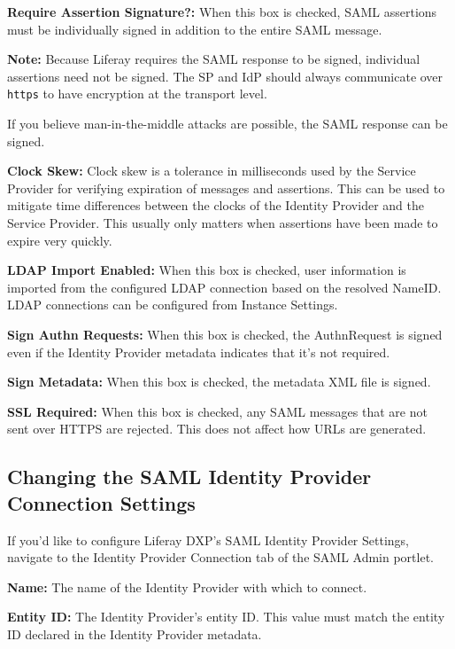 \textbf{Require Assertion Signature?:} When this box is checked, SAML
assertions must be individually signed in addition to the entire SAML
message.

\noindent\hrulefill

\textbf{Note:} Because Liferay requires the SAML response to be signed,
individual assertions need not be signed. The SP and IdP should always
communicate over \texttt{https} to have encryption at the transport
level.

If you believe man-in-the-middle attacks are possible, the SAML response
can be signed.

\noindent\hrulefill

\textbf{Clock Skew:} Clock skew is a tolerance in milliseconds used by
the Service Provider for verifying expiration of messages and
assertions. This can be used to mitigate time differences between the
clocks of the Identity Provider and the Service Provider. This usually
only matters when assertions have been made to expire very quickly.

\textbf{LDAP Import Enabled:} When this box is checked, user information
is imported from the configured LDAP connection based on the resolved
NameID. LDAP connections can be configured from Instance Settings.

\textbf{Sign Authn Requests:} When this box is checked, the AuthnRequest
is signed even if the Identity Provider metadata indicates that it's not
required.

\textbf{Sign Metadata:} When this box is checked, the metadata XML file
is signed.

\textbf{SSL Required:} When this box is checked, any SAML messages that
are not sent over HTTPS are rejected. This does not affect how URLs are
generated.

\subsection{Changing the SAML Identity Provider Connection
Settings}\label{changing-the-saml-identity-provider-connection-settings}

If you'd like to configure Liferay DXP's SAML Identity Provider
Settings, navigate to the Identity Provider Connection tab of the SAML
Admin portlet.

\textbf{Name:} The name of the Identity Provider with which to connect.

\textbf{Entity ID:} The Identity Provider's entity ID. This value must
match the entity ID declared in the Identity Provider metadata.

